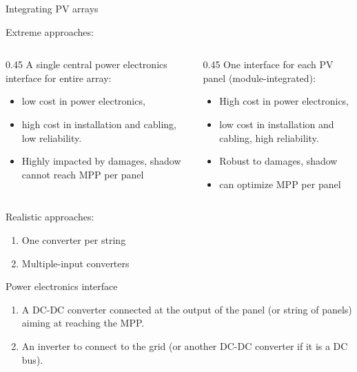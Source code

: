 \begin{frame}[allowframebreaks]{Integrating PV arrays}

Extreme approaches:

\begin{columns}
  \begin{column}{0.45\textwidth}
    A single central power electronics interface for entire array:
    \begin{itemize}
      \item low cost in power electronics,
      \item high cost in installation and cabling, low reliability.
      \item Highly impacted by damages, shadow cannot reach MPP per panel
    \end{itemize}
  \end{column}
  \begin{column}{0.45\textwidth}
  One interface for each PV panel (module-integrated):
  \begin{itemize}
    \item High cost in power electronics,
    \item low cost in installation and cabling, high reliability.
    \item Robust to damages, shadow
    \item can optimize MPP per panel
  \end{itemize}
  \end{column}
\end{columns}

\newpage
{Realistic approaches:}
\begin{enumerate}
  \item One converter per string
  \item Multiple-input converters
\end{enumerate}
\end{frame}

\begin{frame}{Power electronics interface}
\begin{enumerate}
  \item A DC-DC converter connected at the output of the panel (or string of panels) aiming at reaching the MPP.
  \item An inverter to connect to the grid (or another DC-DC converter if it is a DC bus).
\end{enumerate}
\end{frame}

